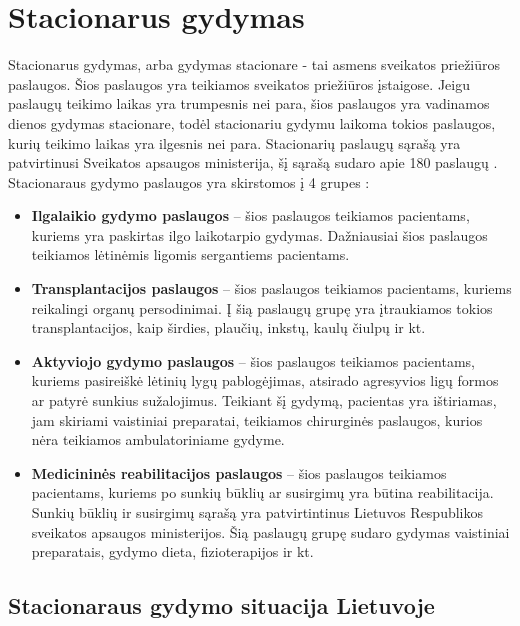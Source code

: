 \section{Stacionarus gydymas}

Stacionarus gydymas, arba gydymas stacionare - tai asmens sveikatos priežiūros paslaugos. Šios paslaugos yra teikiamos sveikatos priežiūros įstaigose. Jeigu paslaugų teikimo laikas yra trumpesnis nei para, šios paslaugos yra vadinamos dienos gydymas stacionare, todėl stacionariu gydymu laikoma tokios paslaugos, kurių teikimo laikas yra ilgesnis nei para. Stacionarių paslaugų sąrašą yra patvirtinusi Sveikatos apsaugos ministerija, šį sąrašą sudaro apie 180 paslaugų \cite{StacionaroPaslaugos}. Stacionaraus gydymo paslaugos yra skirstomos į 4 grupes \cite{LigoniuKasa}: 
\begin{itemize}
    \item \textbf{Ilgalaikio gydymo paslaugos} – šios paslaugos teikiamos pacientams, kuriems yra paskirtas ilgo laikotarpio gydymas. Dažniausiai šios paslaugos teikiamos lėtinėmis ligomis sergantiems pacientams.
    \item \textbf{Transplantacijos paslaugos} – šios paslaugos teikiamos pacientams, kuriems reikalingi organų persodinimai. Į šią paslaugų grupę yra įtraukiamos tokios transplantacijos, kaip širdies, plaučių, inkstų, kaulų čiulpų ir kt. 
    \item \textbf{Aktyviojo gydymo paslaugos} – šios paslaugos teikiamos pacientams, kuriems pasireiškė lėtinių lygų pablogėjimas, atsirado agresyvios ligų formos ar patyrė sunkius sužalojimus. Teikiant šį gydymą, pacientas yra ištiriamas, jam skiriami vaistiniai preparatai, teikiamos chirurginės paslaugos, kurios nėra teikiamos ambulatoriniame gydyme.
    \item \textbf{Medicininės reabilitacijos paslaugos} – šios paslaugos teikiamos pacientams, kuriems po sunkių būklių ar susirgimų yra būtina reabilitacija. Sunkių būklių ir susirgimų sąrašą yra patvirtintinus Lietuvos Respublikos sveikatos apsaugos ministerijos.  Šią paslaugų grupę sudaro gydymas vaistiniai preparatais, gydymo dieta, fizioterapijos ir kt.
\end{itemize}

\subsection{Stacionaraus gydymo situacija Lietuvoje}

